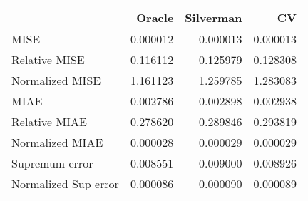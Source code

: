 \begin{tabular}{lrrr}
  \toprule
 & Oracle & Silverman & CV \\ 
  \midrule
MISE & 0.000012 & 0.000013 & 0.000013 \\ 
  Relative MISE & 0.116112 & 0.125979 & 0.128308 \\ 
  Normalized MISE & 1.161123 & 1.259785 & 1.283083 \\ 
  MIAE & 0.002786 & 0.002898 & 0.002938 \\ 
  Relative MIAE & 0.278620 & 0.289846 & 0.293819 \\ 
  Normalized MIAE & 0.000028 & 0.000029 & 0.000029 \\ 
  Supremum error & 0.008551 & 0.009000 & 0.008926 \\ 
  Normalized Sup error & 0.000086 & 0.000090 & 0.000089 \\ 
   \bottomrule
\end{tabular}
